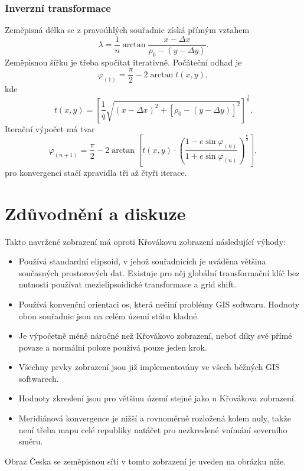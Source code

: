 \documentclass[a4paper]{article}
\begin{document}
\subsubsection{Inverzní transformace}
Zeměpisná délka se z pravoúhlých souřadnic získá přímým vztahem
\begin{equation*}
\lambda = \frac{1}{n} \arctan{\frac{x - \Delta x}{\rho_0 - (y - \Delta y)}}.
\end{equation*}
Zeměpisnou šířku je třeba spočítat iterativně. Počáteční odhad je
\begin{equation*}
\varphi_{(1)} = \frac{\pi}{2} - 2 \arctan{t(x,y)},
\end{equation*}
kde
\begin{equation*}
t(x,y) = \left[\frac{1}{q}\sqrt{(x - \Delta x)^2 + [\rho_0 - (y - \Delta y)]^2}\right]^{\frac{1}{n}}.
\end{equation*}
Iterační výpočet má tvar
\begin{equation*}
\varphi_{(n+1)} = \frac{\pi}{2} - 2 \arctan{\left[t(x,y) \cdot \left(\frac{1-e\sin{\varphi_{(n)}}}{1+e\sin{\varphi_{(n)}}}\right)^{\frac{e}{2}}\right]},
\end{equation*}
pro konvergenci stačí zpravidla tři až čtyři iterace.

\section{Zdůvodnění a diskuze}
Takto navržené zobrazení má oproti Křovákovu zobrazení následující výhody:
\begin{itemize}
  \item Používá standardní elipsoid, v jehož souřadnicích je uváděna většina současných prostorových dat. Existuje pro něj globální transformační klíč bez nutnosti používat mezielipsoidické transformace a grid shift.
  \item Používá konvenční orientaci os, která nečiní problémy GIS softwaru. Hodnoty obou souřadnic jsou na celém území státu kladné.
  \item Je výpočetně méně náročné než Křovákovo zobrazení, neboť díky své přímé povaze a normální poloze používá pouze jeden krok.
  \item Všechny prvky zobrazení jsou již implementovány ve všech běžných GIS softwarech. 
  \item Hodnoty zkreslení jsou pro většinu území stejné jako u Křovákova zobrazení.
  \item Meridiánová konvergence je nižší a rovnoměrně rozložená kolem nuly, takže není třeba mapu celé republiky natáčet pro nezkreslené vnímání severního směru.
\end{itemize}
Obraz Česka se zeměpisnou sítí v tomto zobrazení je uveden na obrázku níže.


\end{document}
